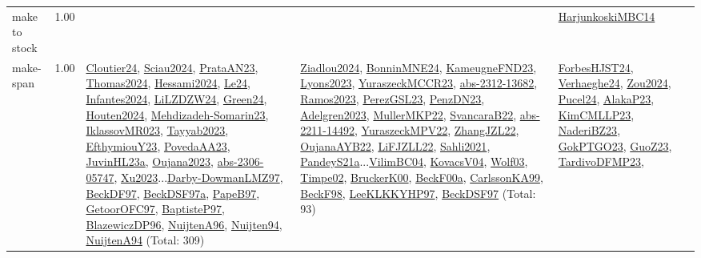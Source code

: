 {\begin{longtable}{p{3cm}r>{\raggedright\arraybackslash}p{6cm}>{\raggedright\arraybackslash}p{6cm}>{\raggedright\arraybackslash}p{8cm}}
\index{make to stock}\index{Concepts!make to stock}make to stock &  1.00 &  &  & \hyperref[detail:HarjunkoskiMBC14]{HarjunkoskiMBC14}\\
\index{make-span}\index{Concepts!make-span}make-span &  1.00 & \hyperref[detail:Cloutier24]{Cloutier24}, \hyperref[detail:Sciau2024]{Sciau2024}, \hyperref[detail:PrataAN23]{PrataAN23}, \hyperref[detail:Thomas2024]{Thomas2024}, \hyperref[detail:Hessami2024]{Hessami2024}, \hyperref[detail:Le24]{Le24}, \hyperref[detail:Infantes2024]{Infantes2024}, \hyperref[detail:LiLZDZW24]{LiLZDZW24}, \hyperref[detail:Green24]{Green24}, \hyperref[detail:Houten2024]{Houten2024}, \hyperref[detail:Mehdizadeh-Somarin23]{Mehdizadeh-Somarin23}, \hyperref[detail:IklassovMR023]{IklassovMR023}, \hyperref[detail:Tayyab2023]{Tayyab2023}, \hyperref[detail:EfthymiouY23]{EfthymiouY23}, \hyperref[detail:PovedaAA23]{PovedaAA23}, \hyperref[detail:JuvinHL23a]{JuvinHL23a}, \hyperref[detail:Oujana2023]{Oujana2023}, \hyperref[detail:abs-2306-05747]{abs-2306-05747}, \hyperref[detail:Xu2023]{Xu2023}...\hyperref[detail:Darby-DowmanLMZ97]{Darby-DowmanLMZ97}, \hyperref[detail:BeckDF97]{BeckDF97}, \hyperref[detail:BeckDSF97a]{BeckDSF97a}, \hyperref[detail:PapeB97]{PapeB97}, \hyperref[detail:GetoorOFC97]{GetoorOFC97}, \hyperref[detail:BaptisteP97]{BaptisteP97}, \hyperref[detail:BlazewiczDP96]{BlazewiczDP96}, \hyperref[detail:NuijtenA96]{NuijtenA96}, \hyperref[detail:Nuijten94]{Nuijten94}, \hyperref[detail:NuijtenA94]{NuijtenA94} (Total: 309) & \hyperref[detail:Ziadlou2024]{Ziadlou2024}, \hyperref[detail:BonninMNE24]{BonninMNE24}, \hyperref[detail:KameugneFND23]{KameugneFND23}, \hyperref[detail:Lyons2023]{Lyons2023}, \hyperref[detail:YuraszeckMCCR23]{YuraszeckMCCR23}, \hyperref[detail:abs-2312-13682]{abs-2312-13682}, \hyperref[detail:Ramos2023]{Ramos2023}, \hyperref[detail:PerezGSL23]{PerezGSL23}, \hyperref[detail:PenzDN23]{PenzDN23}, \hyperref[detail:Adelgren2023]{Adelgren2023}, \hyperref[detail:MullerMKP22]{MullerMKP22}, \hyperref[detail:SvancaraB22]{SvancaraB22}, \hyperref[detail:abs-2211-14492]{abs-2211-14492}, \hyperref[detail:YuraszeckMPV22]{YuraszeckMPV22}, \hyperref[detail:ZhangJZL22]{ZhangJZL22}, \hyperref[detail:OujanaAYB22]{OujanaAYB22}, \hyperref[detail:LiFJZLL22]{LiFJZLL22}, \hyperref[detail:Sahli2021]{Sahli2021}, \hyperref[detail:PandeyS21a]{PandeyS21a}...\hyperref[detail:VilimBC04]{VilimBC04}, \hyperref[detail:KovacsV04]{KovacsV04}, \hyperref[detail:Wolf03]{Wolf03}, \hyperref[detail:Timpe02]{Timpe02}, \hyperref[detail:BruckerK00]{BruckerK00}, \hyperref[detail:BeckF00a]{BeckF00a}, \hyperref[detail:CarlssonKA99]{CarlssonKA99}, \hyperref[detail:BeckF98]{BeckF98}, \hyperref[detail:LeeKLKKYHP97]{LeeKLKKYHP97}, \hyperref[detail:BeckDSF97]{BeckDSF97} (Total: 93) & \hyperref[detail:ForbesHJST24]{ForbesHJST24}, \hyperref[detail:Verhaeghe24]{Verhaeghe24}, \hyperref[detail:Zou2024]{Zou2024}, \hyperref[detail:Pucel24]{Pucel24}, \hyperref[detail:AlakaP23]{AlakaP23}, \hyperref[detail:KimCMLLP23]{KimCMLLP23}, \hyperref[detail:NaderiBZ23]{NaderiBZ23}, \hyperref[detail:GokPTGO23]{GokPTGO23}, \hyperref[detail:GuoZ23]{GuoZ23}, \hyperref[detail:TardivoDFMP23]{TardivoDFMP23}, 
\end{longtable}}
